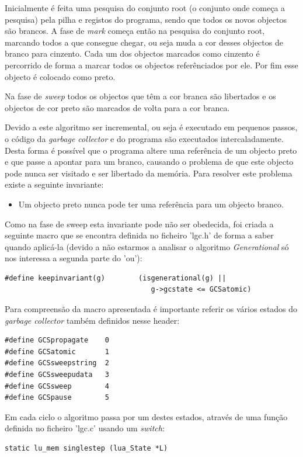 \documentclass{article}
\begin{document}
Inicialmente é feita uma pesquisa do conjunto root (o conjunto onde começa a pesquisa) pela pilha e registos do programa, sendo que todos os novos objectos são brancos.
A fase de \emph{mark} começa então na pesquisa do conjunto root, marcando todos a que consegue chegar, ou seja muda a cor desses objectos de branco para cinzento.
Cada um dos objectos marcados como cinzento é percorrido de forma a marcar todos os objectos referênciados por ele. Por fim esse objecto é colocado como preto. 

Na fase de \emph{sweep} todos os objectos que têm a cor branca são libertados e os objectos de cor preto são marcados de volta para a cor branca.

Devido a este algoritmo ser incremental, ou seja é executado em pequenos passos, o código da \emph{garbage collector} e do programa são executados intercaladamente.
Desta forma é possível que o programa altere uma referência de um objecto preto e que passe a apontar para um branco, causando o problema de que este objecto pode nunca ser visitado e ser libertado da memória.
Para resolver este problema existe a seguinte invariante:
\begin{itemize}
\item Um objecto preto nunca pode ter uma referência para um objecto branco.
\end{itemize}

Como na fase de sweep esta invariante pode não ser obedecida, foi  criada a seguinte macro que se encontra definida no ficheiro 'lgc.h' de forma a saber quando aplicá-la (devido a não estarmos a analisar o algoritmo \emph{Generational} só nos interessa a segunda parte do 'ou'):
\begin{verbatim}
#define keepinvariant(g)        (isgenerational(g) ||
                                   g->gcstate <= GCSatomic)
\end{verbatim}

Para compreensão da macro apresentada é importante referir os vários estados do \emph{garbage collector} também definidos nesse header:
\begin{verbatim}
#define GCSpropagate    0
#define GCSatomic       1
#define GCSsweepstring  2
#define GCSsweepudata   3
#define GCSsweep        4
#define GCSpause        5
\end{verbatim}

Em cada ciclo o algoritmo passa por um destes estados, através de uma função definida no ficheiro 'lgc.c' usando um \emph{switch}:
\begin{verbatim}
static lu_mem singlestep (lua_State *L)
\end{verbatim}
\end{document}
